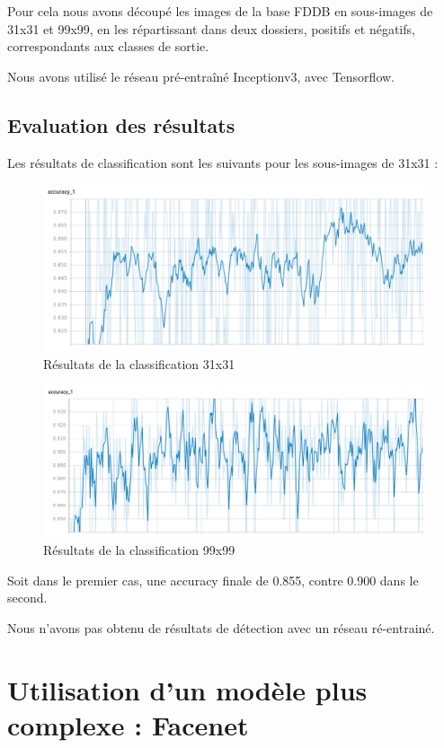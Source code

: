 \documentclass[a4paper,11pt]{article}
\begin{document}
Pour cela nous avons découpé les images de la base FDDB en sous-images de 31x31 et 99x99, en les répartissant dans deux dossiers, positifs et négatifs, correspondants aux classes de sortie.

Nous avons utilisé le réseau pré-entraîné Inceptionv3, avec Tensorflow.

\subsection{Evaluation des résultats}

Les résultats de classification sont les suivants pour les sous-images de 31x31 :

\begin{figure}[H]
    \centering
    \includegraphics[scale=0.42]{transfer1.png}
    \caption{Résultats de la classification 31x31}
\end{figure}

\begin{figure}[H]
    \centering
    \includegraphics[scale=0.55]{transfer2.png}
    \caption{Résultats de la classification 99x99}
\end{figure}

Soit dans le premier cas, une accuracy finale de 0.855, contre 0.900 dans le second.

Nous n'avons pas obtenu de résultats de détection avec un réseau ré-entrainé.

\section{Utilisation d'un modèle plus complexe : Facenet}
\end{document}
